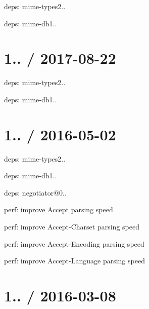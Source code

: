 
\begin{DoxyItemize}
\item deps\+: mime-\/types2..
\begin{DoxyItemize}
\item deps\+: mime-\/db1..
\end{DoxyItemize}
\end{DoxyItemize}

\section*{1.. / 2017-\/08-\/22 }


\begin{DoxyItemize}
\item deps\+: mime-\/types2..
\begin{DoxyItemize}
\item deps\+: mime-\/db1..
\end{DoxyItemize}
\end{DoxyItemize}

\section*{1.. / 2016-\/05-\/02 }


\begin{DoxyItemize}
\item deps\+: mime-\/types2..
\begin{DoxyItemize}
\item deps\+: mime-\/db1..
\end{DoxyItemize}
\item deps\+: negotiator@0..
\begin{DoxyItemize}
\item perf\+: improve {\ttfamily Accept} parsing speed
\item perf\+: improve {\ttfamily Accept-\/\+Charset} parsing speed
\item perf\+: improve {\ttfamily Accept-\/\+Encoding} parsing speed
\item perf\+: improve {\ttfamily Accept-\/\+Language} parsing speed
\end{DoxyItemize}
\end{DoxyItemize}

\section*{1.. / 2016-\/03-\/08 }



